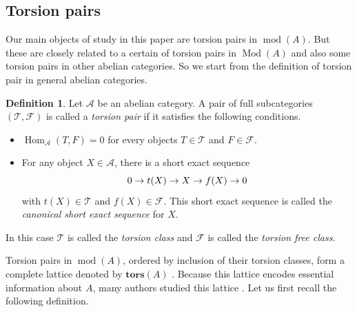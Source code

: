 \documentclass[12pt]{amsart}
\numberwithin{equation}{section}
\theoremstyle{definition}
\newtheorem{definition}[lemma]{Definition}
\DeclareMathOperator{\Mod}{Mod}
\DeclareMathOperator{\modd}{mod}
\DeclareMathOperator{\Hom}{Hom}
\newtheorem*{theorem 0*}{Theorem}
\newtheorem*{theorem a*}{Theorem A}
\newtheorem*{theorem b*}{Theorem B}
\numberwithin{diagram}{section}
\begin{document}
\subsection{Torsion pairs}
Our main objects of study in this paper are torsion pairs in $\modd(A)$. 
But these are closely related to a certain of torsion pairs in $\Mod(A)$ and also some torsion pairs in other abelian categories. So we start from the definition of torsion pair in general abelian categories.
	
\begin{definition}
Let $\mathcal{A}$ be an abelian category. A pair of full subcategories $(\mathcal{T},\mathcal{F})$ is called a {\em torsion pair} if it satisfies the following conditions.
	\begin{itemize}
			\item[(1)] $\Hom_{\mathcal{A}}(T,F)=0$ for every objects $T\in \mathcal{T}$ and $F\in \mathcal{F}$.
			\item[(2)] For any object $X\in \mathcal{A}$, there is a short exact sequence 
		\begin{equation}
				0\rightarrow t(X)\rightarrow X\rightarrow f(X)\rightarrow 0 \notag
		\end{equation}
			with $t(X)\in \mathcal{T}$ and $f(X)\in \mathcal{F}$. This short exact sequence is called the {\it canonical short exact sequence} for $X$.
	\end{itemize}
	In this case $\mathcal{T}$ is called the {\em torsion class} and $\mathcal{F}$ is called the {\em torsion free class}.
\end{definition}
	
Torsion pairs in $\modd(A)$, ordered by inclusion of their torsion classes, form a complete lattice denoted by $\textbf{tors}(A)$ \cite{DIRRT}. Because this lattice encodes essential information about $A$, many authors studied this lattice \cite{AIR,DIJ,BKZ,DIRRT}.
Let us first recall the following definition.
	
\end{document}
